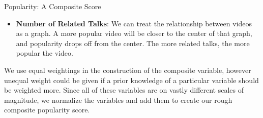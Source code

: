 \begin{frame}{Popularity: A Composite Score}
	\begin{itemize}
		\item \textbf{Number of Related Talks}: We can treat the relationship between videos as a graph. A more popular video will be closer to the center of that graph, and popularity drops off from the center. The more related talks, the more popular the video.
	\end{itemize}
We use equal weightings in the construction of the composite variable, however unequal weight could be given if a prior knowledge of a particular variable should be weighted more.
Since all of these variables are on vastly different scales of magnitude, we normalize the variables and add them to create our rough composite popularity score. 	
	
\end{frame}

